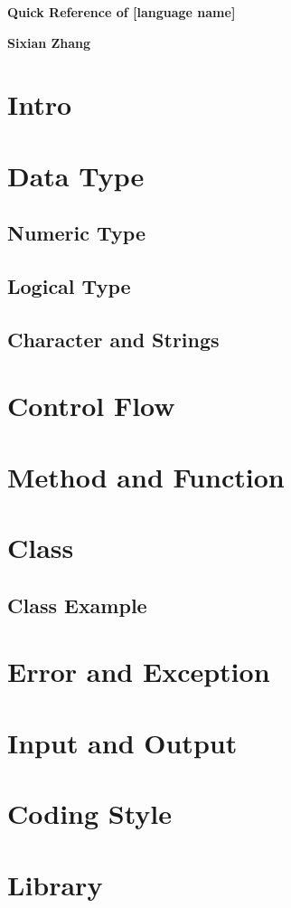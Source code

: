 \documentclass[a4paper,11pt]{article}
\begin{document}
\begin{center}
\Large
\textbf{Quick Reference of [language name]}

\textbf{Sixian Zhang}
\end{center}

\section{Intro}

\section{Data Type}

\subsection{Numeric Type}

\subsection{Logical Type}

\subsection{Character and Strings}

\section{Control Flow}

\section{Method and Function}

\section{Class}

\subsection{Class Example}

\section{Error and Exception}

\section{Input and Output}

\section{Coding Style}

\section{Library}
\end{document}

